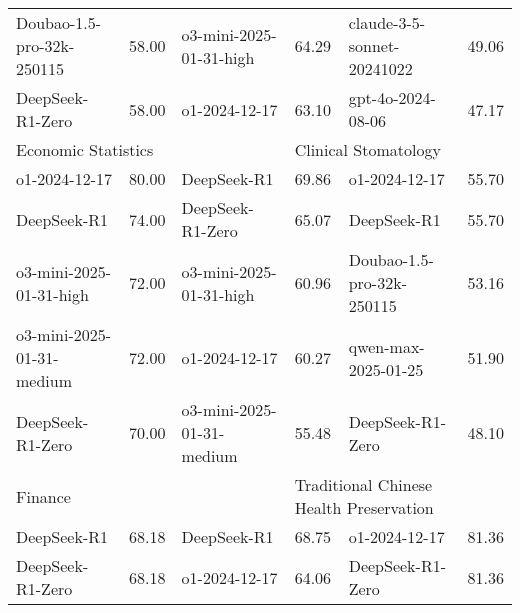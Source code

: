 {\begin{longtable}{p{4.2cm}>{\centering\arraybackslash} p{0.8cm}|p{4.2cm} >{\centering\arraybackslash} p{0.8cm}|p{4.2cm} >{\centering\arraybackslash} p{0.8cm}}
\cellcolor{teal!5} Doubao-1.5-pro-32k-250115 & \cellcolor{teal!2}58.00 & \cellcolor{blue!5} o3-mini-2025-01-31-high & \cellcolor{blue!2} 64.29 & \cellcolor{yellow!5} claude-3-5-sonnet-20241022 & \cellcolor{yellow!2} 49.06\\
\cellcolor{teal!5} DeepSeek-R1-Zero & \cellcolor{teal!2}58.00 & \cellcolor{blue!5} o1-2024-12-17 & \cellcolor{blue!2} 63.10 & \cellcolor{yellow!5} gpt-4o-2024-08-06 & \cellcolor{yellow!2} 47.17\\
\hline
\multicolumn{2}{p{5.15cm}|}{\cellcolor{pink!10} \centering Economic Statistics} & \multicolumn{2}{p{5.15cm}|}{\cellcolor{blue!10} \centering Engineering Thermophysics} & \multicolumn{2}{p{5.15cm}}{\cellcolor{yellow!10} \centering Clinical Stomatology}\\
\hline
\cellcolor{pink!5} o1-2024-12-17 & \cellcolor{pink!2}80.00 & \cellcolor{blue!5} DeepSeek-R1 & \cellcolor{blue!2} 69.86 & \cellcolor{yellow!5} o1-2024-12-17 & \cellcolor{yellow!2} 55.70\\
\cellcolor{pink!5} DeepSeek-R1 & \cellcolor{pink!2}74.00 & \cellcolor{blue!5} DeepSeek-R1-Zero & \cellcolor{blue!2} 65.07 & \cellcolor{yellow!5} DeepSeek-R1 & \cellcolor{yellow!2} 55.70\\
\cellcolor{pink!5} o3-mini-2025-01-31-high & \cellcolor{pink!2}72.00 & \cellcolor{blue!5} o3-mini-2025-01-31-high & \cellcolor{blue!2} 60.96 & \cellcolor{yellow!5} Doubao-1.5-pro-32k-250115 & \cellcolor{yellow!2} 53.16\\
\cellcolor{pink!5} o3-mini-2025-01-31-medium & \cellcolor{pink!2}72.00 & \cellcolor{blue!5} o1-2024-12-17 & \cellcolor{blue!2} 60.27 & \cellcolor{yellow!5} qwen-max-2025-01-25 & \cellcolor{yellow!2} 51.90\\
\cellcolor{pink!5} DeepSeek-R1-Zero & \cellcolor{pink!2}70.00 & \cellcolor{blue!5} o3-mini-2025-01-31-medium & \cellcolor{blue!2} 55.48 & \cellcolor{yellow!5} DeepSeek-R1-Zero & \cellcolor{yellow!2} 48.10\\
\hline
\multicolumn{2}{p{5.15cm}|}{\cellcolor{pink!10} \centering Finance} & \multicolumn{2}{p{5.15cm}|}{\cellcolor{blue!10} \centering Fluid Machinery and Engineering} & \multicolumn{2}{p{5.15cm}}{\cellcolor{yellow!10} \centering Traditional Chinese Health Preservation}\\
\hline
\cellcolor{pink!5} DeepSeek-R1 & \cellcolor{pink!2}68.18 & \cellcolor{blue!5} DeepSeek-R1 & \cellcolor{blue!2} 68.75 & \cellcolor{yellow!5} o1-2024-12-17 & \cellcolor{yellow!2} 81.36\\
\cellcolor{pink!5} DeepSeek-R1-Zero & \cellcolor{pink!2}68.18 & \cellcolor{blue!5} o1-2024-12-17 & \cellcolor{blue!2} 64.06 & \cellcolor{yellow!5} DeepSeek-R1-Zero & \cellcolor{yellow!2} 81.36\\

\end{longtable}}
